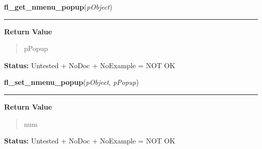 \hspace{.8\funcindent}\begin{boxedminipage}{\funcwidth}

    \raggedright \textbf{fl\_get\_nmenu\_popup}(\textit{pObject})

    \vspace{-1.5ex}

    \rule{\textwidth}{0.5\fboxrule}
\setlength{\parskip}{2ex}
\setlength{\parskip}{1ex}
      \textbf{Return Value}
    \vspace{-1ex}

      \begin{quote}
      pPopup

      \end{quote}

\textbf{Status:} Untested + NoDoc + NoExample = NOT OK



    \end{boxedminipage}

    \label{xformslib:library:fl_set_nmenu_popup}

    \vspace{0.5ex}

\hspace{.8\funcindent}\begin{boxedminipage}{\funcwidth}

    \raggedright \textbf{fl\_set\_nmenu\_popup}(\textit{pObject}, \textit{pPopup})

    \vspace{-1.5ex}

    \rule{\textwidth}{0.5\fboxrule}
\setlength{\parskip}{2ex}
\setlength{\parskip}{1ex}
      \textbf{Return Value}
    \vspace{-1ex}

      \begin{quote}
      num

      \end{quote}

\textbf{Status:} Untested + NoDoc + NoExample = NOT OK



    \end{boxedminipage}

    \label{xformslib:library:fl_get_nmenu_item}

